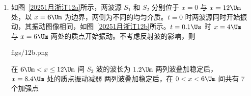 \documentclass[\gkver]{gaokaozhenti}
\begin{document}
\begin{enumerate}
{B．同理可知 P、Q 产生的光电子在 K 处 Q 的最大初动能比 P 较大，根据 $\lambda = \frac{h}{p} = \frac{h}{\sqrt{2mE_{km}}}$ 可知最小德布罗意波长，P 大于 Q，选项 B 正确；

C．因 Q 对应的能量最大，则氢原子向第一激发态跃迁发光时，根据 $h\nu = E_{m} - E_{2}$ 可知三束光中 Q 对应的能级最高，选项 C 正确；

D．对应于图 2 中的 M 点，P 和 Q 的光电流相等，可知 P 和 Q 单位时间到达阳极 A 的光电子数目相等，选项 D 错误。

故选 BC。
}

\item
如图~\ref{20251月浙江12a}所示，两波源 $S_{1}$ 和 $S_{2}$ 分别位于 $x = 0$ 与 $x = 12 \Um$ 处，以 $x = 6 \Um$ 为边界，两侧为不同的均匀介质。$t = 0$ 时两波源同时开始振动，其振动图像相同，如图~\ref{20251月浙江12b}所示。$t = 0.1 \Us$ 时 $x = 4 \Um$ 与 $x = 6 \Um$ 两处的质点开始振动。不考虑反射波的影响，则

{figs/12b.png}

{在 $6 \Um < x \leq 12 \Um$ 间 $S_{2}$ 波的波长为 $1.2 \Um$}
{两列波叠加稳定后，$x = 8.4 \Um$ 处的质点振动减弱}
{两列波叠加稳定后，在 $0 < x < 6 \Um$ 间共有 7 个加强点}

\end{enumerate}
\end{document}
